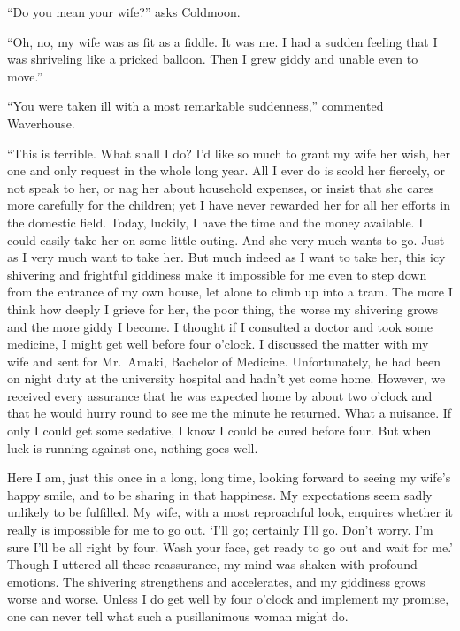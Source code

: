 \documentclass{book}
\begin{document}
``Do you mean your wife?'' asks Coldmoon.

``Oh, no, my wife was as fit as a fiddle. It was me. I had a sudden
feeling that I was shriveling like a pricked balloon. Then I grew giddy
and unable even to move.''

``You were taken ill with a most remarkable suddenness,'' commented
Waverhouse.

``This is terrible. What shall I do? I'd like so much to grant my wife
her wish, her one and only request in the whole long year. All I ever do
is scold her fiercely, or not speak to her, or nag her about household
expenses, or insist that she cares more carefully for the children; yet
I have never rewarded her for all her efforts in the domestic field.
Today, luckily, I have the time and the money available. I could easily
take her on some little outing. And she very much wants to go. Just as I
very much want to take her. But much indeed as I want to take her, this
icy shivering and frightful giddiness make it impossible for me even to
step down from the entrance of my own house, let alone to climb up into
a tram. The more I think how deeply I grieve for her, the poor thing,
the worse my shivering grows and the more giddy I become. I thought if I
consulted a doctor and took some medicine, I might get well before four
o'clock. I discussed the matter with my wife and sent for Mr.~Amaki,
Bachelor of Medicine. Unfortunately, he had been on night duty at the
university hospital and hadn't yet come home. However, we received every
assurance that he was expected home by about two o'clock and that he
would hurry round to see me the minute he returned. What a nuisance. If
only I could get some sedative, I know I could be cured before four. But
when luck is running against one, nothing goes well.

Here I am, just this once in a long, long time, looking forward to
seeing my wife's happy smile, and to be sharing in that happiness. My
expectations seem sadly unlikely to be fulfilled. My wife, with a most
reproachful look, enquires whether it really is impossible for me to go
out. `I'll go; certainly I'll go. Don't worry. I'm sure I'll be all
right by four. Wash your face, get ready to go out and wait for me.'
Though I uttered all these reassurance, my mind was shaken with profound
emotions. The shivering strengthens and accelerates, and my giddiness
grows worse and worse. Unless I do get well by four o'clock and
implement my promise, one can never tell what such a pusillanimous woman
might do.
\end{document}
